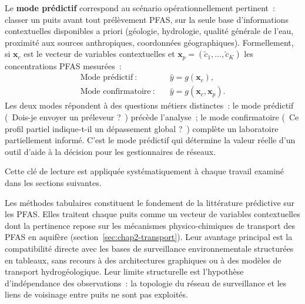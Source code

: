 Le \textbf{mode pr\'edictif} correspond au sc\'enario op\'erationnellement pertinent~: classer un puits avant tout pr\'el\`evement PFAS, sur la seule base d'informations contextuelles disponibles a priori (g\'eologie, hydrologie, qualit\'e g\'en\'erale de l'eau, proximit\'e aux sources anthropiques, coordonn\'ees g\'eographiques).
Formellement, si $\mathbf{x}_c$ est le vecteur de variables contextuelles et $\mathbf{x}_p = (\tilde{c}_1, \ldots, \tilde{c}_K)$ les concentrations PFAS mesur\'ees~:
\begin{align}
    \text{Mode pr\'edictif}~: & \quad \hat{y} = g(\mathbf{x}_c), \label{eq:mode-pred} \\
    \text{Mode confirmatoire}~: & \quad \hat{y} = g(\mathbf{x}_c, \mathbf{x}_p). \label{eq:mode-conf}
\end{align}
Les deux modes r\'epondent \`a des questions m\'etiers distinctes~: le mode pr\'edictif (\guillemotleft{}~Dois-je envoyer un pr\'eleveur ?~\guillemotright{}) pr\'ec\`ede l'analyse~; le mode confirmatoire (\guillemotleft{}~Ce profil partiel indique-t-il un d\'epassement global ?~\guillemotright{}) compl\`ete un laboratoire partiellement inform\'e.
C'est le mode pr\'edictif qui d\'etermine la valeur r\'eelle d'un outil d'aide \`a la d\'ecision pour les gestionnaires de r\'eseaux.

Cette cl\'e de lecture est appliqu\'ee syst\'ematiquement \`a chaque travail examin\'e dans les sections suivantes.


\label{sec:chap2-tabulaire}

Les m\'ethodes tabulaires constituent le fondement de la litt\'erature pr\'edictive sur les PFAS.
Elles traitent chaque puits comme un vecteur de variables contextuelles dont la pertinence repose sur les m\'ecanismes physico-chimiques de transport des PFAS en aquif\`ere (section~\ref{sec:chap2-transport}).
Leur avantage principal est la compatibilit\'e directe avec les bases de surveillance environnementale structur\'ees en tableaux, sans recours \`a des architectures graphiques ou \`a des mod\`eles de transport hydrog\'eologique.
Leur limite structurelle est l'hypoth\`ese d'ind\'ependance des observations~: la topologie du r\'eseau de surveillance et les liens de voisinage entre puits ne sont pas exploit\'es.


\label{sec:chap2-bayes}

